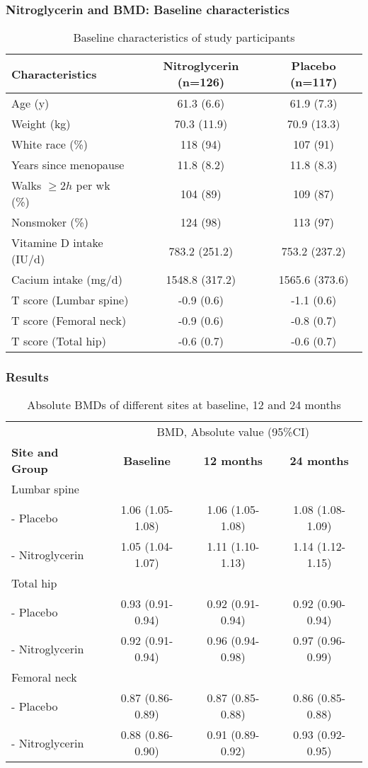 \documentclass[table,10pt]{beamer}
\begin{document}
\begin{CJK*}{UTF8}{gbsn}
\begin{frame}[t]
\frametitle{Nitroglycerin and BMD: Baseline characteristics}
\begin{table}
\footnotesize
\caption{Baseline characteristics of study participants}
\begin{tabular}{lcc}
\hline
Characteristics & Nitroglycerin (n=126) & Placebo (n=117)\\
\hline
Age (y) & 61.3 (6.6) & 61.9 (7.3)\\
\hline
Weight (kg) & 70.3 (11.9) & 70.9 (13.3)\\
\hline
White race (\%) & 118 (94) & 107 (91)\\
\hline
Years since menopause & 11.8 (8.2) & 11.8 (8.3)\\
\hline
Walks $\ge 2h$ per wk (\%) & 104 (89) & 109 (87)\\
\hline
Nonsmoker (\%) & 124 (98) & 113 (97)\\
\hline
Vitamine D intake (IU/d) & 783.2 (251.2) & 753.2 (237.2)\\
\hline
Cacium intake (mg/d) & 1548.8 (317.2) & 1565.6 (373.6)\\
\hline
T score (Lumbar spine) & -0.9 (0.6) & -1.1 (0.6)\\
\hline
T score (Femoral neck) & -0.9 (0.6) & -0.8 (0.7)\\
\hline
T score (Total hip) & -0.6 (0.7) & -0.6 (0.7)\\
\hline  
\end{tabular}
\end{table}
\end{frame}

\begin{frame}[t]
\frametitle{Results}
\begin{table}
\footnotesize
\caption{Absolute BMDs of different sites at baseline, 12 and 24 months}
\begin{tabular}{lccc}
\hline
 & \multicolumn{3}{c}{BMD, Absolute value (95\%CI)}\\
 \cline{2-4}
{\bf Site and Group} & {\bf Baseline} & {\bf 12 months} & {\bf 24 months}\\
\hline
Lumbar spine & & & \\ 
- Placebo & 1.06 (1.05-1.08) & 1.06 (1.05-1.08) & 1.08 (1.08-1.09)\\
- Nitroglycerin & 1.05 (1.04-1.07) & 1.11 (1.10-1.13) & 1.14 (1.12-1.15)\\
\hline
Total hip & & & \\
- Placebo & 0.93 (0.91-0.94) & 0.92 (0.91-0.94) & 0.92 (0.90-0.94)\\
- Nitroglycerin & 0.92 (0.91-0.94) & 0.96 (0.94-0.98) & 0.97 (0.96-0.99)\\
\hline
Femoral neck & & & \\
- Placebo & 0.87 (0.86-0.89) & 0.87 (0.85-0.88) & 0.86 (0.85-0.88)\\
- Nitroglycerin & 0.88 (0.86-0.90) & 0.91 (0.89-0.92) & 0.93 (0.92-0.95)\\
\hline
\end{tabular}
\end{table}
\end{frame}




\end{CJK*}
\end{document}
